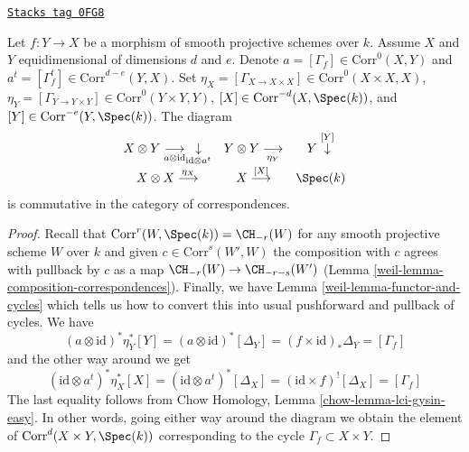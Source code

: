 \begin{lemma}
\label{weil-lemma-prep-dual}
\href{https://stacks.math.columbia.edu/tag/0FG8}{\texttt{Stacks tag 0FG8}}

Let $f : Y \to X$ be a morphism of smooth projective schemes over $k$.
Assume $X$ and $Y$ equidimensional of dimensions $d$ and $e$.
Denote $a = [\Gamma_f] \in \text{Corr}^0(X, Y)$ and
$a^t = [\Gamma_f^t] \in \text{Corr}^{d - e}(Y, X)$.
Set
$\eta_X = [\Gamma_{X \to X \times X}] \in \text{Corr}^0(X \times X, X)$,
$\eta_Y = [\Gamma_{Y \to Y \times Y}] \in \text{Corr}^0(Y \times Y, Y)$,
$[X] \in \text{Corr}^{-d}(X, \Spec(k))$, and
$[Y] \in \text{Corr}^{-e}(Y, \Spec(k))$. The diagram
$$
\begin{array}{ccc}X \otimes Y \underset{a \otimes \text{id}}{\longrightarrow}\underset{\text{id} \otimes a^t}{\downarrow} & Y \otimes Y \underset{\eta_Y}{\longrightarrow} & Y \overset{[Y]}{\downarrow} \\ X \otimes X \overset{\eta_X}{\longrightarrow} & X \overset{[X]}{\longrightarrow} & \Spec(k)\end{array}
$$
is commutative in the category of correspondences.
\end{lemma}

\begin{proof}

Recall that $\text{Corr}^r(W, \Spec(k)) = \CH_{-r}(W)$ for any
smooth projective scheme $W$ over $k$
and given $c \in \text{Corr}^s(W', W)$ the composition
with $c$ agrees with pullback by $c$ as a map
$\CH_{-r}(W) \to \CH_{-r - s}(W')$
(Lemma \ref{weil-lemma-composition-correspondences}).
Finally, we have Lemma \ref{weil-lemma-functor-and-cycles}
which tells us how to convert this into usual
pushforward and pullback of cycles.
We have
$$
(a \otimes \text{id})^* \eta_Y^* [Y] =
(a \otimes \text{id})^* [\Delta_Y] =
(f \times \text{id})_*\Delta_Y = [\Gamma_f]
$$
and the other way around we get
$$
(\text{id} \otimes a^t)^* \eta_X^* [X] =
(\text{id} \otimes a^t)^* [\Delta_X] =
(\text{id} \times f)^![\Delta_X] = [\Gamma_f]
$$
The last equality follows from
Chow Homology, Lemma \ref{chow-lemma-lci-gysin-easy}.
In other words, going either way around the diagram we
obtain the element of $\text{Corr}^d(X \times Y, \Spec(k))$
corresponding to the cycle $\Gamma_f \subset X \times Y$.
\end{proof}

